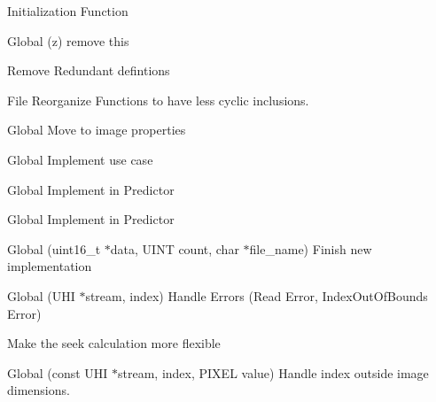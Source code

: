 \begin{DoxyRefList}
Initialization Function  
\item[Global \doxylink{predictor_8h_a2fee6f8dd7f3cd3ed1ae75161294c4c4}{Ps} (z)]\label{todo__todo000021}%
%
remove this 

\label{todo__todo000026}%
%
Remove Redundant defintions  
\item[File \doxylink{quantizer_8h}{quantizer.h} ]\label{todo__todo000023}%
%
Reorganize Functions to have less cyclic inclusions.  
\item[Global \doxylink{structs__predictor__constants_a259eb38bab418aa26b68d33d542cfdcb}{s\+\_\+predictor\+\_\+constants\+::k\+Dynamic\+Range} ]\label{todo__todo000006}%
%
Move to image properties  
\item[Global \doxylink{structs__predictor__constants_aa9543722f3ac4cee7db1aa2c20c289e9}{s\+\_\+predictor\+\_\+constants\+::k\+Lossless\+Compression} ]\label{todo__todo000005}%
%
Implement use case  
\item[Global \doxylink{structs__predictor__constants_a28a0b943ff8fd3c6785446e6e6bee86b}{s\+\_\+predictor\+\_\+constants\+::k\+Weight\+Exponent\+Offset\+Flag} ]\label{todo__todo000008}%
%
Implement in Predictor 
\item[Global \doxylink{structs__predictor__constants_adbe6968c0ea7ede4b53717162999a6dd}{s\+\_\+predictor\+\_\+constants\+::k\+Weight\+Initialization} ]\label{todo__todo000007}%
%
Implement in Predictor  
\item[Global \doxylink{csv-io_8h_a3e3e00c9789afb1d2f5f2c7004bd82ad}{Save\+Array\+As\+CSV} (uint16\+\_\+t \texorpdfstring{$\ast$}{*}data, UINT count, char \texorpdfstring{$\ast$}{*}file\+\_\+name)]\label{todo__todo000013}%
%
Finish new implementation  
\item[Global \doxylink{uhi__io_8h_ad7fd2d84633ee6e0355a950deeacd220}{UHI\+\_\+\+Read\+Pixel} (UHI \texorpdfstring{$\ast$}{*}stream, \doxylink{structdim3}{dim3} index)]\label{todo__todo000016}%
%
Handle Errors (Read Error, Index\+Out\+Of\+Bounds Error) 



Make the seek calculation more flexible  
\item[Global \doxylink{uhi__io_8h_a9c23d248f87897f71d177a12cdfebf84}{UHI\+\_\+\+Write\+Pixel} (const UHI \texorpdfstring{$\ast$}{*}stream, \doxylink{structdim3}{dim3} index, PIXEL value)]\label{todo__todo000015}%
%
Handle index outside image dimensions. 
\end{DoxyRefList}